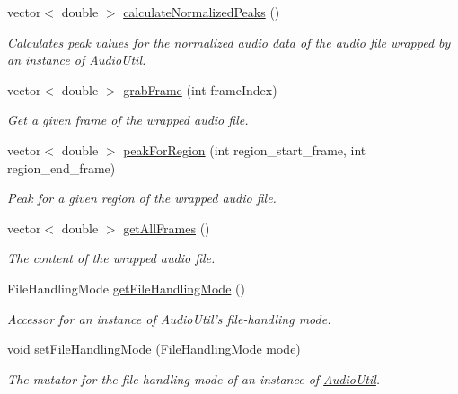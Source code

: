 \begin{DoxyCompactItemize}
vector$<$ double $>$ \hyperlink{classAudioUtil_a13513ca40750bfc2c71e269e1826fadc}{calculateNormalizedPeaks} ()
\begin{DoxyCompactList}\small\item\em Calculates peak values for the normalized audio data of the audio file wrapped by an instance of \hyperlink{classAudioUtil}{AudioUtil}. \item\end{DoxyCompactList}\item 
vector$<$ double $>$ \hyperlink{classAudioUtil_a6aa717262c503b4c6b238fdebdc1d1ca}{grabFrame} (int frameIndex)
\begin{DoxyCompactList}\small\item\em Get a given frame of the wrapped audio file. \item\end{DoxyCompactList}\item 
vector$<$ double $>$ \hyperlink{classAudioUtil_ac32f8bd852e56ada63ea24fa666c08db}{peakForRegion} (int region\_\-start\_\-frame, int region\_\-end\_\-frame)
\begin{DoxyCompactList}\small\item\em Peak for a given region of the wrapped audio file. \item\end{DoxyCompactList}\item 
vector$<$ double $>$ \hyperlink{classAudioUtil_a6cd1c1137a4ab43565ea6275e5dc0eb4}{getAllFrames} ()
\begin{DoxyCompactList}\small\item\em The content of the wrapped audio file. \item\end{DoxyCompactList}\item 
FileHandlingMode \hyperlink{classAudioUtil_af2e6ba95a82a2a28cb880247e22b9e64}{getFileHandlingMode} ()
\begin{DoxyCompactList}\small\item\em Accessor for an instance of AudioUtil's file-\/handling mode. \item\end{DoxyCompactList}\item 
void \hyperlink{classAudioUtil_aa6e29dfd59fb16462f5ee00ce7c311db}{setFileHandlingMode} (FileHandlingMode mode)
\begin{DoxyCompactList}\small\item\em The mutator for the file-\/handling mode of an instance of \hyperlink{classAudioUtil}{AudioUtil}. \item\end{DoxyCompactList}\end{DoxyCompactItemize}


